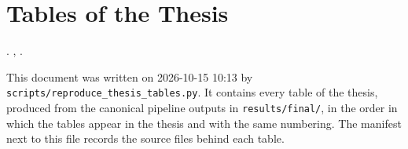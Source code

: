 \documentclass[12pt,a4paper]{report}
\begin{document}
\chapter*{Tables of the Thesis}
\noindent\ThesisTitle. \ThesisType, \ThesisAuthor.\par\medskip
\noindent This document was written on 2026-10-15 10:13 by \texttt{scripts/reproduce\_thesis\_tables.py}. It contains every table of the thesis, produced from the canonical pipeline outputs in \texttt{results/final/}, in the order in which the tables appear in the thesis and with the same numbering. The manifest next to this file records the source files behind each table.\par
\clearpage
\renewcommand{\thetable}{4.1}
\renewcommand{\theHtable}{4.1}

\clearpage
\renewcommand{\thetable}{4.2}
\renewcommand{\theHtable}{4.2}

\clearpage
\renewcommand{\thetable}{5.1}
\renewcommand{\theHtable}{5.1}

\clearpage
\renewcommand{\thetable}{5.2}
\renewcommand{\theHtable}{5.2}

\clearpage
\renewcommand{\thetable}{5.3}
\renewcommand{\theHtable}{5.3}

\clearpage
\renewcommand{\thetable}{5.4}
\renewcommand{\theHtable}{5.4}

\clearpage
\renewcommand{\thetable}{5.5}
\renewcommand{\theHtable}{5.5}

\clearpage
\renewcommand{\thetable}{6.1}
\renewcommand{\theHtable}{6.1}

\clearpage
\renewcommand{\thetable}{6.2}
\renewcommand{\theHtable}{6.2}

\clearpage
\renewcommand{\thetable}{6.3}
\renewcommand{\theHtable}{6.3}

\clearpage
\renewcommand{\thetable}{6.4}
\renewcommand{\theHtable}{6.4}

\clearpage
\renewcommand{\thetable}{A.1}
\renewcommand{\theHtable}{A.1}

\clearpage
\renewcommand{\thetable}{A.2}
\renewcommand{\theHtable}{A.2}

\clearpage
\renewcommand{\thetable}{A.3}
\renewcommand{\theHtable}{A.3}

\clearpage
\renewcommand{\thetable}{A.4}
\renewcommand{\theHtable}{A.4}

\clearpage
\end{document}
